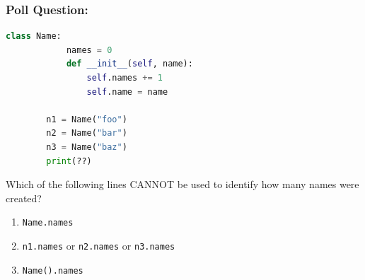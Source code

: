 \documentclass{beamer}
\begin{document}
%
%
%
\begin{frame}[fragile]
	\frametitle{Poll Question: }
	\begin{minipage}{0.49\textwidth}
		\begin{lstlisting}[language=Python, autogobble]
		class Name:
			names = 0
			def __init__(self, name):
				self.names += 1
				self.name = name

		n1 = Name("foo")
		n2 = Name("bar")
		n3 = Name("baz")
		print(??)
		\end{lstlisting}
	\end{minipage}
	\hfill
	\begin{minipage}{0.49\textwidth}
		Which of the following lines CANNOT be used to identify how many names were created?
		\begin{enumerate}[A]
			\item \lstinline|Name.names|
			\item \lstinline|n1.names| or \lstinline|n2.names| or \lstinline|n3.names|
			\item \lstinline|Name().names|
		\end{enumerate}
	\end{minipage}
\end{frame}
\end{document}
